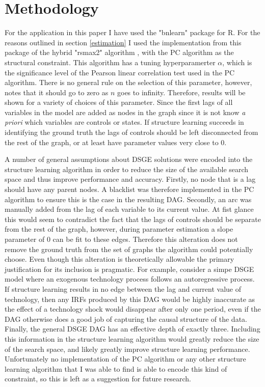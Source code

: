 \documentclass{article}
\begin{document}
\section{Methodology}

For the application in this paper I have used the "bnlearn" package \parencite{scutari2010bnlearn} for R. For the reasons outlined in section \ref{estimation} I used the implementation from this package of the hybrid "rsmax2" algorithm \parencite{spirtes2000causation}, with the PC algorithm as the structural constraint. This algorithm has a tuning hyperparamerter $\alpha$, which is the significance level of the Pearson linear correlation test used in the PC algorithm. There is no general rule on the selection of this parameter, however, \citeauthor{kalisch2007estimating} notes that it should go to zero as $n$ goes to infinity. Therefore, results will be shown for a variety of choices of this parameter. Since the first lags of all variables in the model are added as nodes in the graph since it is not know \textit{a priori} which variables are controls or states. If structure learning succeeds in identifying the ground truth the lags of controls should be left disconnected from the rest of the graph, or at least have parameter values very close to 0. 

A number of general assumptions about DSGE solutions were encoded into the structure learning algorithm in order to reduce the size of the available search space and thus improve performance and accuracy. Firstly, no node that is a lag should have any parent nodes. A blacklist was therefore implemented in the PC algorithm to ensure this is the case in the resulting DAG. Secondly, an arc was manually added from the lag of each variable to its current value. At fist glance this would seem to contradict the fact that the lags of controls should be separate from the rest of the graph, however, during parameter estimation a slope parameter of 0 can be fit to these edges. Therefore this alteration does not remove the ground truth from the set of graphs the algorithm could potentially choose. Even though this alteration is theoretically allowable the primary justification for its inclusion is pragmatic. For example, consider a simpe DSGE model where an exogenous technology process follows an autoregressive process. If structure learning results in no edge between the lag and current value of technology, then any IRFs produced by this DAG would be highly inaccurate as the effect of a technology shock would disappear after only one period, even if the DAG otherwise does a good job of capturing the causal structure of the data.
Finally, the general DSGE DAG has an effective depth of exactly three. Including this information in the structure learning algorithm would greatly reduce the size of the search space, and likely greatly improve structure learning performance. Unfortunately no implementation of the PC algorithm or any other structure learning algorithm that I was able to find is able to encode this kind of constraint, so this is left as a suggestion for future research. 
\end{document}
